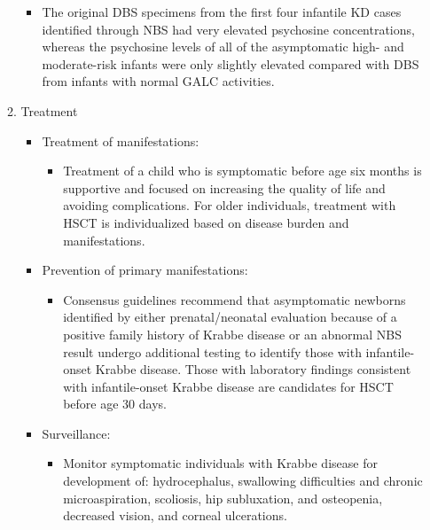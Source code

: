 \documentclass{scrartcl}
\begin{document}
\begin{enumerate}
\begin{enumerate}
\begin{itemize}
\item The original DBS specimens from the first four infantile
KD cases identified through NBS had very elevated psychosine
concentrations, whereas the psychosine levels of all of the
asymptomatic high- and moderate-risk infants were only slightly
elevated compared with DBS from infants with normal GALC activities.
\end{itemize}

\item Treatment
\label{sec:orga2c919c}

\begin{itemize}
\item Treatment of manifestations:
\begin{itemize}
\item Treatment of a child who is symptomatic before age six months is
supportive and focused on increasing the quality of life and
avoiding complications. For older individuals, treatment with HSCT
is individualized based on disease burden and manifestations.
\end{itemize}

\item Prevention of primary manifestations:
\begin{itemize}
\item Consensus guidelines recommend that asymptomatic newborns
identified by either prenatal/neonatal evaluation because of a
positive family history of Krabbe disease or an abnormal NBS
result undergo additional testing to identify those with
infantile-onset Krabbe disease. Those with laboratory findings
consistent with infantile-onset Krabbe disease are candidates for
HSCT before age 30 days.
\end{itemize}

\item Surveillance:
\begin{itemize}
\item Monitor symptomatic individuals with Krabbe disease for
development of: hydrocephalus, swallowing difficulties and chronic
microaspiration, scoliosis, hip subluxation, and osteopenia,
decreased vision, and corneal ulcerations.
\end{itemize}
\end{itemize}
\end{enumerate}
\end{enumerate}
\end{document}
